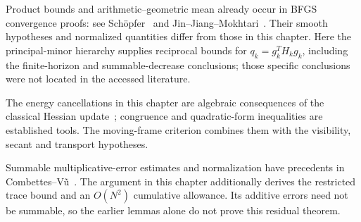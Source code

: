 Product bounds and arithmetic--geometric mean already occur in BFGS convergence proofs: see Sch\"opfer~\cite[proof of Theorem~3.7]{S16} and Jin--Jiang--Mokhtari~\cite[Appendices C--D]{FND_JJM24AW}. Their smooth hypotheses and normalized quantities differ from those in this chapter. Here the principal-minor hierarchy supplies reciprocal bounds for $q_k=g_k^TH_kg_k$, including the finite-horizon and summable-decrease conclusions; those specific conclusions were not located in the accessed literature.

The energy cancellations in this chapter are algebraic consequences of the classical Hessian update~\cite[Section~5]{FND_N92}; congruence and quadratic-form inequalities are established tools. The moving-frame criterion combines them with the visibility, secant and transport hypotheses.

Summable multiplicative-error estimates and normalization have precedents in Combettes--V\~u~\cite[Lemmas 2.2--2.3]{FND_CV13}. The argument in this chapter additionally derives the restricted trace bound and an $O(N^2)$ cumulative allowance. Its additive errors need not be summable, so the earlier lemmas alone do not prove this residual theorem.
